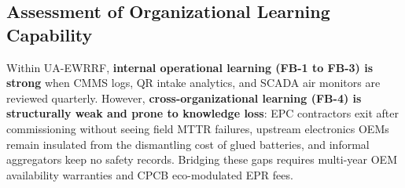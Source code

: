 \subsection{Assessment of Organizational Learning Capability}
Within UA-EWRRF, \textbf{internal operational learning (FB-1 to FB-3) is strong} when CMMS logs, QR intake analytics, and SCADA air monitors are reviewed quarterly. However, \textbf{cross-organizational learning (FB-4) is structurally weak and prone to knowledge loss}: EPC contractors exit after commissioning without seeing field MTTR failures, upstream electronics OEMs remain insulated from the dismantling cost of glued batteries, and informal aggregators keep no safety records. Bridging these gaps requires multi-year OEM availability warranties and CPCB eco-modulated EPR fees.
